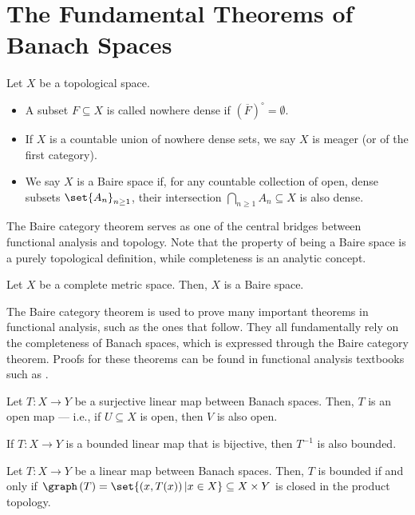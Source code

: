 \section{The Fundamental Theorems of Banach Spaces}%
\begin{definition}
  Let $X$ be a topological space.
  \begin{itemize}
    \item A subset $F\subseteq X$ is called nowhere dense if $\left(\overline{F}\right)^{\circ} = \emptyset$.
    \item If $X$ is a countable union of nowhere dense sets, we say $X$ is meager (or of the first category).
    \item We say $X$ is a Baire space if, for any countable collection of open, dense subsets $\set{A_n}_{n\geq 1}$, their intersection $\bigcap_{n\geq 1}A_n\subseteq X$ is also dense.
  \end{itemize}
\end{definition}
The Baire category theorem serves as one of the central bridges between functional analysis and topology. Note that the property of being a Baire space is a purely topological definition, while completeness is an analytic concept.
\begin{theorem}\label{thm:baire}
  Let $X$ be a complete metric space. Then, $X$ is a Baire space.
\end{theorem}
The Baire category theorem is used to prove many important theorems in functional analysis, such as the ones that follow. They all fundamentally rely on the completeness of Banach spaces, which is expressed through the Baire category theorem. Proofs for these theorems can be found in functional analysis textbooks such as \cite{rudin_functional_analysis}.
\begin{theorem}\label{thm:open_mapping}
  Let $T\colon X\rightarrow Y$ be a surjective linear map between Banach spaces. Then, $T$ is an open map --- i.e., if $U\subseteq X$ is open, then $V$ is also open.
\end{theorem}
\begin{corollary}\label{cor:bounded_inverse}
  If $T\colon X\rightarrow Y$ is a bounded linear map that is bijective, then $T^{-1}$ is also bounded.
\end{corollary}
\begin{theorem}\label{thm:closed_graph}
  Let $T\colon X\rightarrow Y$ be a linear map between Banach spaces. Then, $T$ is bounded if and only if $\graph\left(T\right) = \set{\left(x,T(x)\right)| x\in X} \subseteq X\times Y$ is closed in the product topology.
\end{theorem}
